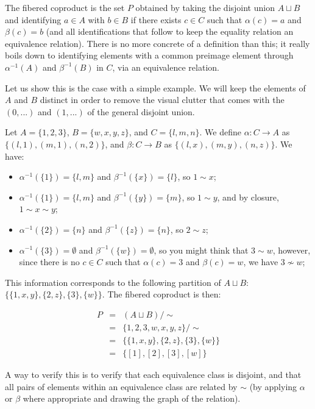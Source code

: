 \documentclass[12pt, letterpaper, twoside]{report}
\begin{document}
The fibered coproduct is the set $P$ obtained by taking the disjoint union $A \sqcup B$ and identifying $a \in A$ with $b \in B$ if there exists $c \in C$ such that $\alpha(c) = a$ and $\beta(c) = b$ (and all identifications that follow to keep the equality relation an equivalence relation). There is no more concrete of a definition than this; it really boils down to identifying elements with a common preimage element through $\alpha^{-1}(A)$ and $\beta^{-1}(B)$ in $C$, via an equivalence relation.

Let us show this is the case with a simple example. We will keep the elements of $A$ and $B$ distinct in order to remove the visual clutter that comes with the $(0, ...)$ and $(1, ...)$ of the general disjoint union.

Let $A = \{ 1, 2, 3 \}$, $B = \{ w, x, y, z \}$, and $C = \{ l, m, n \}$. We define $\alpha : C \to A$ as $\{ (l, 1), (m, 1), (n, 2) \}$, and $\beta : C \to B$ as $\{ (l, x), (m, y), (n, z) \}$. We have:

\begin{itemize}
	\item $\alpha^{-1}(\{1\}) = \{l,m\}$ and $\beta^{-1}(\{x\}) = \{l\}$, so $1 \sim x$;
	\item $\alpha^{-1}(\{1\}) = \{l,m\}$ and $\beta^{-1}(\{y\}) = \{m\}$, so $1 \sim y$, and by closure, $1 \sim x \sim y$;
	\item $\alpha^{-1}(\{2\}) = \{n\}$ and $\beta^{-1}(\{z\}) = \{n\}$, so $2 \sim z$;
	\item $\alpha^{-1}(\{3\}) = \emptyset$ and $\beta^{-1}(\{w\}) = \emptyset$, so you might think that $3 \sim w$, however, since there is no $c \in C$ such that $\alpha(c) = 3$ and $\beta(c) = w$, we have $3 \nsim w$;
\end{itemize}

This information corresponds to the following partition of $A \sqcup B$: $\{ \{1,x,y\}, \{2,z\}, \{3\}, \{w\} \}$. The fibered coproduct is then:

$$
\begin{array}{lll}
P &=& (A \sqcup B) / \sim \\
  &=& \{1,2,3,w,x,y,z\} / \sim \\
  &=& \{\{1,x,y\}, \{2,z\}, \{3\}, \{w\}\} \\
  &=& \{[1], [2], [3], [w]\}
\end{array}
$$

A way to verify this is to verify that each equivalence class is disjoint, and that all pairs of elements within an equivalence class are related by $\sim$ (by applying $\alpha$ or $\beta$ where appropriate and drawing the graph of the relation).
\newpage
\end{document}
